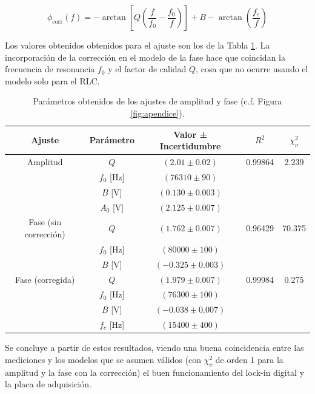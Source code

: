 \begin{equation}
	\phi_\text{corr}(f) = -\arctan \left[ Q \left( \frac{f}{f_0} - \frac{f_0}{f} \right) \right] + B - \arctan \left( \frac{f_c}{f} \right)
\end{equation}



Los valores obtenidos obtenidos para el ajuste son los de la Tabla \ref{tab:rlc_fit_params}. La incorporación de la corrección en el modelo de la fase hace que coincidan la frecuencia de resonancia $f_0$ y el factor de calidad $Q$, cosa que no ocurre usando el modelo solo para el RLC. %

\begin{table}[h!]
	\centering
	\begin{tabular}{ |c | c | c | c | c | }       
		\hline
		Ajuste & Parámetro & Valor ± Incertidumbre & $R^2$ & $\chi^2_\nu$ \\ 
		\hline
		 Amplitud & $Q$   & $(2.01 \pm 0.02)$ & 0.99864 & 2.239 \\		 & $f_0$ [Hz] & $(76310\pm 90)$ &  &  \\ %
		 & $B$  [V] & $(0.130 \pm 0.003)$ &  &  \\ %
		 & $A_0$  [V] & $(2.125 \pm 0.007)$ &  &  \\ %
		 
	\hline
	Fase (sin corrección) & $Q$   & $(1.762 \pm 0.007)$ & 0.96429 & 70.375 \\
	& $f_0$  [Hz] & $(80000\pm 100)$ &  &  \\ %
	& $B$   [V]  & $(-0.325 \pm 0.003)$ &  &  \\ %
	\hline
	Fase (corregida) & $Q$   & $(1.979 \pm 0.007)$ & 0.99984 & 0.275 \\
	& $f_0$  [Hz] & $(76300\pm 100)$ &  &  \\ %
	& $B$   [V]  & $(-0.038 \pm 0.007)$ &  &  \\
	& $f_c$  [Hz] & $(15400 \pm 400)$ &  &  \\ %
	\hline %
	\end{tabular} 
	\caption{Parámetros obtenidos de los ajustes de amplitud y fase (c.f. Figura \ref{fig:apendice}). }  %
	\label{tab:rlc_fit_params} 
\end{table}




Se concluye a partir de estos resultados, viendo una buena coincidencia entre las mediciones y los modelos que se asumen válidos (con $\chi_\nu^2$ de orden 1 para la amplitud y la fase con la corrección) el buen funcionamiento del lock-in digital y la placa de adquisición. %




